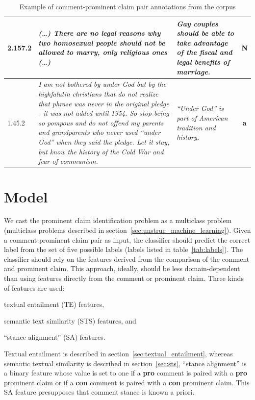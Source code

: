 \begin{table}[t!]
{\begin{tabular}{@{}lp{9.5cm}p{3.5cm}c@{}}
\midrule
2.157.2 & \normalsize{%
\textit{
(\dots) There are no legal reasons why two homosexual people should not be
allowed to marry, only religious ones (\dots)
}
} & \normalsize{%
\textit{
Gay couples should be able to take advantage of the fiscal and legal benefits
of marriage.
}
} & \textbf{N} \\
\midrule
1.45.2 & \normalsize{%
\textit{
 I am not bothered by under God but by the highfalutin christians that do not
 realize that phrase was never in the original pledge - it was not added until
 1954. So stop being so pompous and do not offend my parents and grandparents
 who never used ``under God'' when they said the pledge. Let it stay, but know
 the history of the Cold War and fear of communism.
 }} & 
 \normalsize{
 \textit{
 ``Under God'' is part of American tradition and history.
 }} & \textbf{a}  \\
\bottomrule
\end{tabular}
}
\caption{Example of comment-prominent claim pair annotations from the \ComArg corpus}
\label{tab:comarg}
\end{table}


\section{Model}
\label{sec:argrec_model}

We cast the prominent claim identification problem as a multiclass problem
(multiclass problems described in section~\ref{sec:unstruc_machine_learning}). 
Given a comment-prominent claim pair as input, the classifier should
predict the correct label from the set of five possible labels (labels
listed in table~\ref{tab:labels}). 
The classifier should rely on the features derived from the comparison
of the comment and prominent claim. 
This approach, ideally, should be less domain-dependent than using features
directly from the comment or prominent claim. 
Three kinds of features are used: \begin{enumerate*}
\item textual entailment (TE) features, 
\item semantic text similarity (STS) features, and
\item ``stance alignment'' (SA) features. 
\end{enumerate*}
Textual entailment is described in section~\ref{sec:textual_entailment}, whereas
semantic textual similarity is described in section~\ref{sec:sts}, 
``stance alignment'' is a binary feature whose value is set to one if a
\textbf{pro} comment is paired with a \textbf{pro} prominent claim or if a
\textbf{con} comment is paired with a \textbf{con} prominent claim.  This SA
feature presupposes that comment stance is known a priori.


